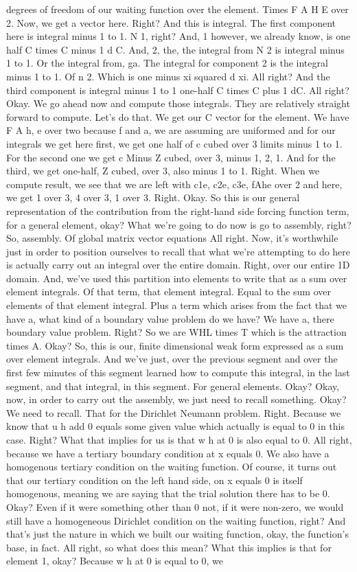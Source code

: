 \documentclass[10pt]{article}
\begin{document}
{degrees of freedom of our waiting function over the element. Times F A H E over 2. Now, we get a vector here. Right? And this is integral. The first component here is integral minus 1 to 1. N 1, right? And, 1 however, we already know, is one half C times C minus 1 d C. And, 2, the, the integral from N 2 is integral minus 1 to 1. Or the integral from, ga. The integral for component 2 is the integral minus 1 to 1. Of n 2. Which is one minus xi squared d xi. All right? And the third component is integral minus 1 to 1 one-half C times C plus 1 dC. All right? Okay. We go ahead now and compute those integrals. They are relatively straight forward to compute. Let's do that. We get our C vector for the element. We have F A h, e over two because f and a, we are assuming are uniformed and for our integrals we get here first, we get one half of c cubed over 3 limits minus 1 to 1. For the second one we get c Minus Z cubed, over 3, minus 1, 2, 1. And for the third, we get one-half, Z cubed, over 3, also minus 1 to 1. Right. When we compute result, we see that we are left with c1e, c2e, c3e, fAhe over 2 and here, we get 1 over 3, 4 over 3, 1 over 3. Right. Okay. So this is our general representation of the contribution from the right-hand side forcing function term, for a general element, okay? What we're going to do now is go to assembly, right? So, assembly. Of global matrix vector equations All right. Now, it's worthwhile just in order to position ourselves to recall that what we're attempting to do here is actually carry out an integral over the entire domain. Right, over our entire 1D domain. And, we've used this partition into elements to write that as a sum over element integrals. Of that term, that element integral. Equal to the sum over elements of that element integral. Plus a term which arises from the fact that we have a, what kind of a boundary value problem do we have? We have a, there  boundary value problem. Right? So we are WHL times T which is the attraction times A. Okay? So, this is our, finite dimensional weak form expressed as a sum over element integrals. And we've just, over the previous segment and over the first few minutes of this segment learned how to compute this integral, in the last segment, and that integral, in this segment. For general elements. Okay? Okay, now, in order to carry out the assembly, we just need to recall something. Okay? We need to recall. That for the Dirichlet Neumann problem. Right. Because we know that u h add 0 equals some given value which actually is equal to 0 in this case. Right? What that implies for us is that w h at 0 is also equal to 0. All right, because we have a tertiary boundary condition at x equals 0. We also have a homogenous tertiary condition on the waiting function. Of course, it turns out that our tertiary condition on the left hand side, on x equals 0 is itself homogenous, meaning we are saying that the trial solution there has to be 0. Okay? Even if it were something other than 0 not, if it were non-zero, we would still have a homogeneous Dirichlet condition on the waiting function, right? And that's just the nature in which we built our waiting function, okay, the function's base, in fact. All right, so what does this mean? What this implies is that for element 1, okay? Because w h at 0 is equal to 0, we }
\end{document}
